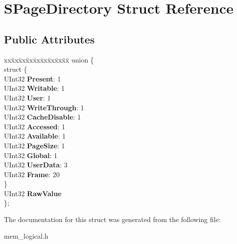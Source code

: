 \hypertarget{struct_s_page_directory}{}\section{S\+Page\+Directory Struct Reference}
\label{struct_s_page_directory}
\subsection*{Public Attributes}
\begin{DoxyCompactItemize}
\item 
\mbox{\label{struct_s_page_directory_a1cf3ac24465be9049801778ffcec737b}} 
\begin{tabbing}
xx\=xx\=xx\=xx\=xx\=xx\=xx\=xx\=xx\=\kill
union \{\\
\mbox{\label{union_s_page_directory_1_1_0D18_a43899e32902110373b79953eb5fc1389}} 
\>struct \{\\
\>\>UInt32 {\bfseries Present}: 1\\
\>\>UInt32 {\bfseries Writable}: 1\\
\>\>UInt32 {\bfseries User}: 1\\
\>\>UInt32 {\bfseries WriteThrough}: 1\\
\>\>UInt32 {\bfseries CacheDisable}: 1\\
\>\>UInt32 {\bfseries Accessed}: 1\\
\>\>UInt32 {\bfseries Available}: 1\\
\>\>UInt32 {\bfseries PageSize}: 1\\
\>\>UInt32 {\bfseries Global}: 1\\
\>\>UInt32 {\bfseries UserData}: 3\\
\>\>UInt32 {\bfseries Frame}: 20\\
\>\} \\
\>UInt32 {\bfseries RawValue}\\
\}; \\

\end{tabbing}\end{DoxyCompactItemize}


The documentation for this struct was generated from the following file\+:\begin{DoxyCompactItemize}
\item 
mem\+\_\+logical.\+h\end{DoxyCompactItemize}
